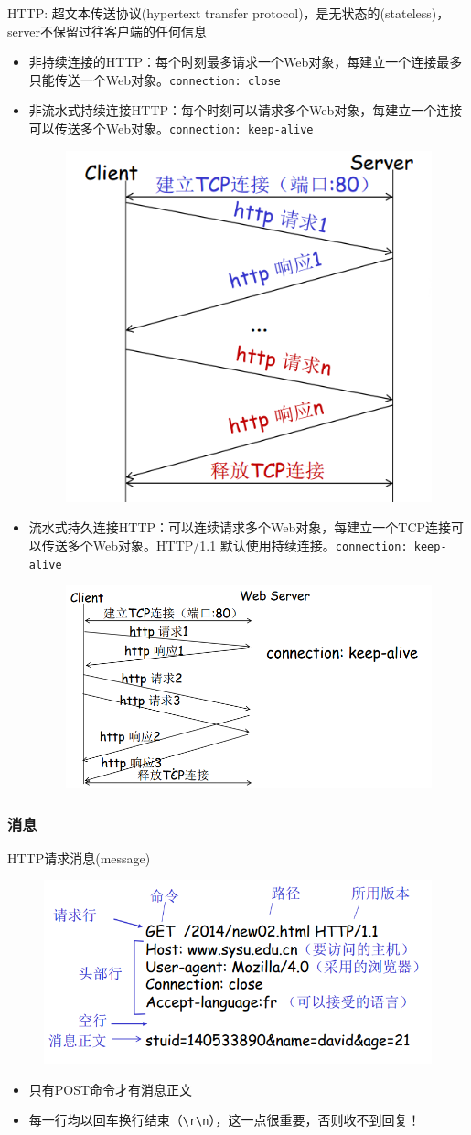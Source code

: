 HTTP: 超文本传送协议(hypertext transfer protocol)，是无状态的(stateless)，server不保留过往客户端的任何信息
\begin{itemize}
\item 非持续连接的HTTP：每个时刻最多请求一个Web对象，每建立一个连接最多只能传送一个Web对象。\verb'connection: close'
\item 非流水式持续连接HTTP：每个时刻可以请求多个Web对象，每建立一个连接可以传送多个Web对象。\verb'connection: keep-alive'
\begin{figure}[H]
    \centering
    \includegraphics[width=0.4\linewidth]{fig/non-pipelining-http.png}
\end{figure}
\item 流水式持久连接HTTP：可以连续请求多个Web对象，每建立一个TCP连接可以传送多个Web对象。HTTP/1.1 默认使用持续连接。\verb'connection: keep-alive'
\begin{figure}[H]
    \centering
    \includegraphics[width=0.6\linewidth]{fig/pipelining-http.png}
\end{figure}
\end{itemize}

\subsubsection{消息}
HTTP请求消息(message)
\begin{figure}[H]
    \centering
    \includegraphics[width=0.6\linewidth]{fig/http-msg.png}
\end{figure}
\begin{itemize}
\item 只有POST命令才有消息正文
\item 每一行均以回车换行结束（\verb'\r\n'），这一点很重要，否则收不到回复！
\end{itemize}

